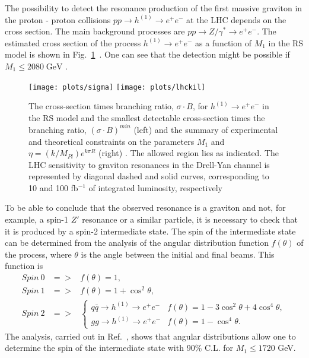 \documentclass{cernyrep}
\begin{document}
The possibility to detect  the resonance production of the first
massive graviton in the proton - proton collisions $p p
\rightarrow h^{(1)} \rightarrow e^{+}e^{-}$ at the LHC  depends on
the cross section. The main background processes are $p p
\rightarrow Z/\gamma^{*} \rightarrow e^{+}e^{-}$. The estimated
cross section of the process $h^{(1)} \rightarrow e^{+}e^{-}$ as a
function of $M_{1}$ in the RS model is shown in
Fig.~\ref{RS:G}~\cite{AOPW}. One can see that the detection might
be possible if $M_{1} \leq 2080 \; \mbox{GeV}$ .
\begin{figure}[htb]
\begin{center}
\leavevmode
\texttt{[image: plots/sigma]}
\texttt{[image: plots/lhckil]}
\end{center}
\caption{The cross-section times branching ratio, $\sigma \cdot
B$, for $h^{(1)} \rightarrow e^{+}e^{-}$ in the RS model and the
smallest detectable cross-section times the branching ratio,
$(\sigma \cdot B)^{min}$ \cite{AOPW} (left)
 and the summary of
experimental and theoretical constraints on the parameters $M_{1}$
and $\eta = (k/M_{Pl}) e^{k\pi R}$ (right) \cite{DHR}. The allowed
region lies as indicated. The LHC sensitivity to graviton
resonances in the Drell-Yan channel is represented by diagonal
dashed and solid curves, corresponding to 10 and 100 fb$^{-1}$ of
integrated luminosity, respectively} \label{RS:G}
\end{figure}


 To be able to conclude that the observed resonance is a
graviton and not, for example, a spin-1 $Z'$ resonance or a
similar particle, it is necessary to check that it is produced by
a spin-2 intermediate state. The spin of the intermediate state
can be determined from the analysis of the angular distribution
function $f(\theta)$ of the process, where $\theta$ is the angle
between the initial and final beams. This function is
\begin{eqnarray*}
  Spin\ 0 & => &  f(\theta)=1 ,\\
  Spin\ 1 & => &  f(\theta)=1 + \cos^{2} \theta, \\
  Spin\ 2 & => & \left\{ \begin{array}{ll}
q\bar{q} \rightarrow h^{(1)} \rightarrow e^{+}e^{-} & f(\theta) =
1 - 3 \cos^{2} \theta + 4\cos^{4} \theta ,\\
gg \rightarrow h^{(1)} \rightarrow e^{+}e^{-} & f(\theta) = 1 -
\cos^{4} \theta. \end{array} \right.
\end{eqnarray*}
 The analysis, carried out in
Ref.~\cite{AOPW}, shows that angular distributions allow one to
determine the spin of the intermediate state with 90\% C.L. for
$M_{1} \leq 1720$ GeV.
\end{document}
